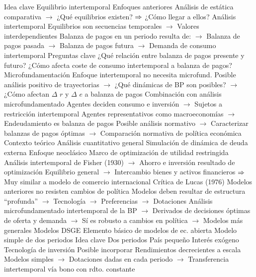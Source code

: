 \documentclass{nuevotema}
\begin{document}
\begin{esquemal}
		\2 Idea clave
			\3 Equilibrio intertemporal
				\4 Enfoques anteriores
				\4[] Análisis de estática comparativa
				\4[] $\to$ ¿Qué equilibrios existen?
				\4[] $\Rightarrow$ ¿Cómo llegar a ellos?
				\4 Análisis intertemporal
				\4[] Equilibrios son secuencias temporales
				\4[] $\to$ Valores interdependientes
				\4[] Balanza de pagos en un periodo resulta de:
				\4[] $\to$ Balanza de pagos pasada
				\4[] $\to$ Balanza de pagos futura
				\4[] $\to$ Demanda de consumo intertemporal
				\4 Preguntas clave
				\4[] ¿Qué relación entre balanza de pagos presente y futuro?
				\4[] ¿Cómo afecta coste de consumo intertemporal a balanza de pagos?
			\3 Microfundamentación
				\4 Enfoque intertemporal no necesita microfund.
				\4[] Posible análisis positivo de trayectorias
				\4[] $\to$ ¿Qué dinámicas de BP son posibles?
				\4[] $\to$ ¿Cómo afectan $\Delta$ $r$ y $\Delta$ $e$ a balanza de pagos
				\4 Combinación con análisis microfundamentado
				\4[] Agentes deciden consumo e inversión
				\4[] $\to$ Sujetos a restricción intertemporal
				\4[] Agentes representativos como macroeconomías
				\4[] $\to$ Endeudamiento es balanza de pagos
				\4[] Posible análisis normativo
				\4[] $\to$ Caracterizar balanzas de pagos óptimas
				\4[] $\to$ Comparación normativa de política económica
			\3 Contexto teórico
				\4 Análisis cuantitativo general
				\4[] Simulación de dinámica de deuda externa
				\4 Enfoque neoclásico
				\4[] Marco de optimización de utilidad restringida
				\4[] Análisis intertemporal de Fisher (1930)
				\4[] $\to$ Ahorro e inversión resultado de optimización
				\4[] Equilibrio general
				\4[] $\to$ Intercambio bienes y activos financieros
				\4[] $\Rightarrow$ Muy similar a modelo de comercio internacional
				\4 Crítica de Lucas (1976)
				\4[] Modelos anteriores no resisten cambios de política
				\4[] Modelos deben resultar de estructura ``profunda''
				\4[] $\to$ Tecnología
				\4[] $\to$ Preferencias
				\4[] $\to$ Dotaciones
				\4[] Análisis microfundamentado intertemporal de la BP
				\4[] $\to$ Derivados de decisiones óptimas de oferta y demanda
				\4[] $\to$ Sí es robusto a cambios en política
				\4[] $\to$ Modelos más generales
				\4 Modelos DSGE
				\4[] Elemento básico de modelos de ec. abierta
		\2 Modelo simple de dos periodos
			\3 Idea clave
				\4 Dos periodos
				\4 País pequeño
				\4[] Interés exógeno
				\4 Tecnología de inversión
				\4[] Posible incorporar
				\4[] Rendimientos decrecientes a escala
				\4[] Modelos simples
				\4[] $\to$ Dotaciones dadas en cada periodo
				\4[] $\to$ Transferencia intertemporal vía bono con rdto. constante

\end{esquemal}
\end{document}
